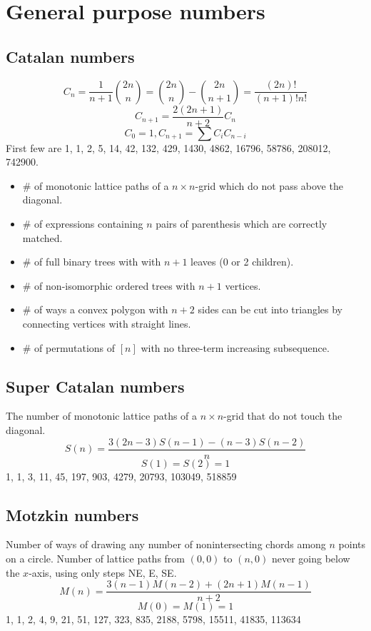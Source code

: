 	\section{General purpose numbers}
		\subsection{Catalan numbers}
			$$C_n=\frac{1}{n+1}\binom{2n}{n}= \binom{2n}{n}-\binom{2n}{n+1} = \frac{(2n)!}{(n+1)!n!}$$
			$$C_{n+1} = \frac{2(2n+1)}{n+2}C_n$$
			$$C_0=1, C_{n+1}=\sum C_iC_{n-i}$$
			First few are 1, 1, 2, 5, 14, 42, 132, 429, 1430, 4862, 16796, 58786, 208012, 742900.
			\begin{itemize}
				\setlength\itemsep{0pt}
				\item \# of monotonic lattice paths of a $n\times n$-grid which do not pass above the diagonal.
				\item \# of expressions containing $n$ pairs of parenthesis which are correctly matched.
				\item \# of full binary trees with with $n+1$ leaves (0 or 2 children).
				\item \# of non-isomorphic ordered trees with $n+1$ vertices.
				\item \# of ways a convex polygon with $n+2$ sides can be cut into triangles by connecting vertices with straight lines.
				\item \# of permutations of $[n]$ with no three-term increasing subsequence.
			\end{itemize}
		
		\subsection{Super Catalan numbers}
			The number of monotonic lattice paths of a $n\times n$-grid that do not touch the diagonal.
			$$S(n) = \frac{3(2n-3)S(n-1)-(n-3)S(n-2)}{n}$$
			$$S(1)=S(2)=1$$
			1, 1, 3, 11, 45, 197, 903, 4279, 20793, 103049, 518859
		
		\subsection{Motzkin numbers}
			Number of ways of drawing any number of nonintersecting chords among $n$ points on a circle. Number of lattice paths from $(0,0)$ to $(n,0)$ never going below the $x$-axis, using only steps NE, E, SE.
			$$M(n) = \frac{3(n-1)M(n-2)+(2n+1)M(n-1)}{n+2}$$
			$$M(0) = M(1) = 1$$
			1, 1, 2, 4, 9, 21, 51, 127, 323, 835, 2188, 5798, 15511, 41835, 113634
		

